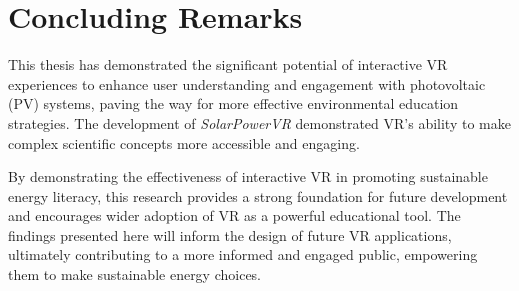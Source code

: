 \documentclass[draft, final]{vutinfth} %
\begin{document}
\section{Concluding Remarks}

This thesis has demonstrated the significant potential of interactive VR experiences to enhance user understanding and engagement with photovoltaic (PV) systems, paving the way for more effective environmental education strategies. The development of \textit{SolarPowerVR} demonstrated VR's ability to make complex scientific concepts more accessible and engaging.

By demonstrating the effectiveness of interactive VR in promoting sustainable energy literacy, this research provides a strong foundation for future development and encourages wider adoption of VR as a powerful educational tool. The findings presented here will inform the design of future VR applications, ultimately contributing to a more informed and engaged public, empowering them to make sustainable energy choices.

\backmatter

\listoffigures %



\printindex

\printglossaries


% 
% 

\end{document}
